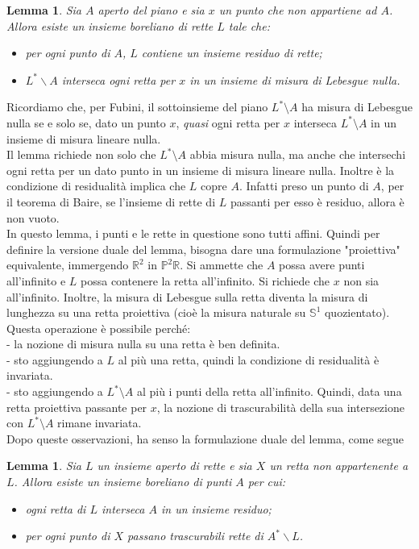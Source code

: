 \documentclass[a4paper, twoside,openright]{article}
\newcommand{\R}{\mathbb{R}}
\renewcommand{\P}{\mathbb{P}}
\renewcommand{\S}{\mathbb{S}}
\newcommand{\<}{\langle}
\renewcommand{\>}{\rangle}
\newtheorem{lemma}[teo]{Lemma}
\begin{document}
\begin{lemma}
Sia $A$ aperto del piano e sia $x$ un punto che non appartiene ad $A$. Allora esiste un insieme boreliano di rette $L$ tale che:
\begin{itemize}
	\item per ogni punto di $A$, $L$ contiene un insieme residuo di rette;
	\item $L^{*} \backslash A$ interseca ogni retta per $x$ in un insieme di misura di Lebesgue nulla.
\end{itemize}
\end{lemma}

Ricordiamo che, per Fubini, il sottoinsieme del piano $L^* \setminus A$ ha misura di Lebesgue nulla se e solo se, dato un punto $x$, \emph{quasi} ogni retta per $x$ interseca $L^* \setminus A$ in un insieme di misura lineare nulla.\\
Il lemma richiede non solo che $L^* \setminus A$ abbia misura nulla, ma anche che intersechi ogni retta per un dato punto in un insieme di misura lineare nulla. 
Inoltre è la condizione di residualità implica che $L$ copre $A$. Infatti preso un punto di $A$, per il teorema di Baire, se l'insieme di rette di $L$ passanti per esso è residuo, allora è non vuoto.\\

In questo lemma, i punti e le rette in questione sono tutti affini. Quindi per definire la versione duale del lemma, bisogna dare una formulazione "proiettiva" equivalente, immergendo $\R^2$ in $\P^2\R$. Si ammette che $A$ possa avere punti all'infinito e $L$ possa contenere la retta all'infinito. Si richiede che $x$ non sia all'infinito. Inoltre, la misura di Lebesgue sulla retta diventa la misura di lunghezza su una retta proiettiva (cioè la misura naturale su $\S^1$ quozientato).\\
Questa operazione è possibile perché:\\
- la nozione di misura nulla su una retta è ben definita.\\
- sto aggiungendo a $L$ al più una retta, quindi la condizione di residualità è invariata.\\
- sto aggiungendo a $L^* \setminus A$ al più i punti della retta all'infinito. Quindi, data una retta proiettiva passante per $x$, la nozione di trascurabilità della sua intersezione con $L^* \setminus A$ rimane invariata.\\
Dopo queste osservazioni, ha senso la formulazione duale del lemma, come segue 

\begin{lemma}
Sia $L$ un insieme aperto di rette e sia $X$ un retta non appartenente a $L$. Allora esiste un insieme boreliano di punti $A$ per cui:


\begin{itemize}
	\item ogni retta di $L$ interseca $A$ in un insieme residuo;
	\item per ogni punto di $X$ passano trascurabili rette di $A^{*} \backslash L$.
\end{itemize}
\end{lemma}
\end{document}
